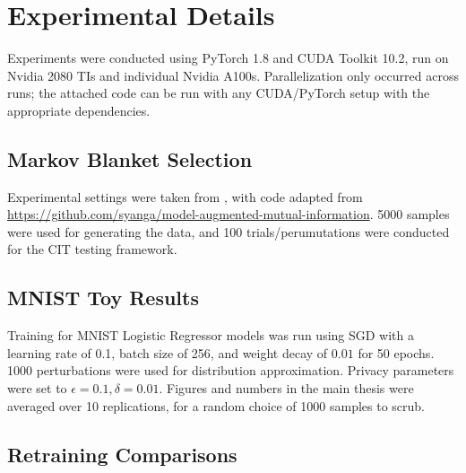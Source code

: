 \section{Experimental Details}\label{app:5:exps}
Experiments were conducted using PyTorch 1.8 and CUDA Toolkit 10.2, run on Nvidia 2080 TIs and individual Nvidia A100s. Parallelization only occurred across runs; the attached code can be run with any CUDA/PyTorch setup with the appropriate dependencies.

\subsection{Markov Blanket Selection}
Experimental settings were taken from \cite{bullseye}, with code adapted from  \url{https://github.com/syanga/model-augmented-mutual-information}. 5000 samples were used for generating the data, and 100 trials/perumutations were conducted for the CIT testing framework. 

\subsection{MNIST Toy Results}
Training for MNIST Logistic Regressor models was run using SGD with a learning rate of 0.1, batch size of 256, and weight decay of $0.01$ for 50 epochs. 1000 perturbations were used for distribution approximation. Privacy parameters were set to $\epsilon=0.1, \delta=0.01$.
Figures and numbers in the main thesis were averaged over 10 replications, for a random choice of 1000 samples to scrub.

\subsection{Retraining Comparisons}
